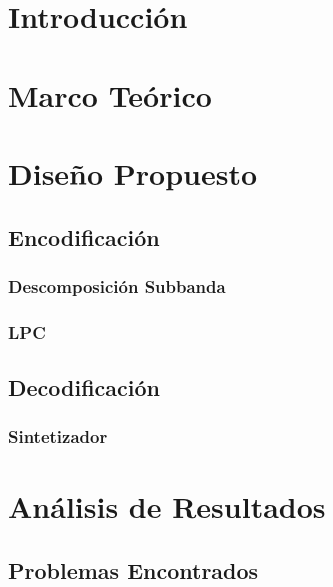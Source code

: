 \documentclass[conference]{IEEEtran}
\begin{document}
\maketitle
\IEEEdisplaynontitleabstractindextext
\IEEEpeerreviewmaketitle

\section{\textbf{Introducción}}\label{intro}


\section{Marco Teórico}


\section{Diseño Propuesto}\label{diseno}



\subsection{Encodificación}

\subsubsection{Descomposición Subbanda}

\subsubsection{LPC}

\subsection{Decodificación}


\subsubsection{Sintetizador}



\section{\textbf{Análisis de Resultados}}\label{secRes}

\subsection{Problemas Encontrados}
\end{document}
